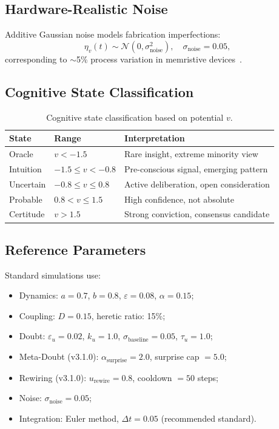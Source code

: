 \documentclass[11pt]{article}
\begin{document}
\subsection{Hardware-Realistic Noise}

Additive Gaussian noise models fabrication imperfections:
\begin{equation}
\eta_v(t) \sim \mathcal{N}(0, \sigma_{\text{noise}}^2), \quad \sigma_{\text{noise}} = 0.05,
\end{equation}
corresponding to $\sim$5\% process variation in memristive devices~\cite{kim2023hfo2}.

\subsection{Cognitive State Classification}

\begin{table}[h]
\centering
\caption{Cognitive state classification based on potential $v$.}
\label{tab:states}
\begin{tabular}{lll}
\toprule
\textbf{State} & \textbf{Range} & \textbf{Interpretation} \\
\midrule
Oracle & $v < -1.5$ & Rare insight, extreme minority view \\
Intuition & $-1.5 \leq v < -0.8$ & Pre-conscious signal, emerging pattern \\
Uncertain & $-0.8 \leq v \leq 0.8$ & Active deliberation, open consideration \\
Probable & $0.8 < v \leq 1.5$ & High confidence, not absolute \\
Certitude & $v > 1.5$ & Strong conviction, consensus candidate \\
\bottomrule
\end{tabular}
\end{table}

\subsection{Reference Parameters}

Standard simulations use:
\begin{itemize}
\item Dynamics: $a = 0.7$, $b = 0.8$, $\varepsilon = 0.08$, $\alpha = 0.15$;
\item Coupling: $D = 0.15$, heretic ratio: 15\%;
\item Doubt: $\varepsilon_u = 0.02$, $k_u = 1.0$, $\sigma_{\text{baseline}} = 0.05$, $\tau_u = 1.0$;
\item Meta-Doubt (v3.1.0): $\alpha_{\text{surprise}} = 2.0$, surprise cap $= 5.0$;
\item Rewiring (v3.1.0): $u_{\text{rewire}} = 0.8$, cooldown $= 50$ steps;
\item Noise: $\sigma_{\text{noise}} = 0.05$;
\item Integration: Euler method, $\Delta t = 0.05$ (recommended standard).
\end{itemize}
\end{document}
